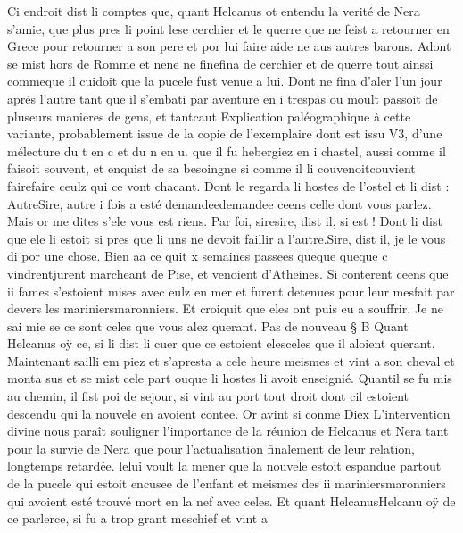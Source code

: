 \documentclass{article}
\begin{document}
\begin{pages}
\pstart  Ci endroit dist li comptes que, quant 
   Helcanus ot entendu la verité de Nera 
   s’amie, que plus pres li point
   lese cerchier et le querre que ne feist a retourner en 
   Grece pour retourner a 
   son pere et por lui faire aide ne 
   aus autres barons. Adont se mist hors de Romme 
   et nene ne finefina
   de cerchier et de querre tout ainssi commeque il cuidoit que 
   la pucele fust venue a lui. Dont ne fina d’aler l’un jour aprés l’autre tant que il s’embati 
   par aventure en i trespas ou moult passoit de pluseurs manieres de
   gens, et tantcaut
   Explication paléographique à cette variante, probablement issue de la copie de l'exemplaire
   dont est issu V3, d'une mélecture du t en c et du n
   en u. que il fu hebergiez en i 
   chastel, aussi comme il faisoit souvent, et enquist de sa besoingne si comme il 
   li couvenoitcouvient 
   fairefaire ceulz qui ce vont chacant. Dont le regarda
   li hostes de l’ostel et li dist :
   AutreSire, autre 
      i fois 
      a
      esté demandeedemandee ceens 
      celle dont vous parlez. Mais or me dites s’ele vous est riens.
   Par foi, siresire, dist il, si est !
   Dont li dist que ele li estoit si pres que li uns ne devoit faillir a l’autre.Sire, dist il, je le vous di por une chose. Bien 
      aa ce quit x semaines passees 
      queque queque c
      vindrentjurent marcheant de Pise,
      et venoient d’Atheines. Si conterent ceens que ii 
         fames s’estoient mises avec eulz en mer et furent detenues pour leur mesfait par devers 
         les mariniersmaronniers.
      Et croiquit que eles ont puis eu a souffrir. Je ne sai mie se ce sont 
      celes que vous alez querant. \pend
\pstart Pas de nouveau § B Quant Helcanus oÿ 
   ce, si li dist li cuer que ce estoient
      elesceles que il aloient querant. Maintenant sailli em piez et 
   s’apresta a cele heure meismes et vint a son cheval et monta sus et se mist 
   cele part ouque li hostes 
   li avoit enseignié. Quantil se fu mis au chemin, il fist poi de sejour, si vint au port 
   tout droit dont cil estoient descendu qui la nouvele 
   en avoient contee. Or avint si conme Diex 
   L'intervention divine nous paraît souligner l'importance de la réunion de Helcanus et Nera
   tant pour la survie de Nera que pour l'actualisation finalement de leur relation, longtemps retardée.
   lelui voult la mener que la nouvele estoit espandue 
   partout de la pucele qui estoit encusee de 
   l’enfant et meismes des ii 
   mariniersmaronniers
   qui avoient esté trouvé mort en la nef avec celes. Et quant 
   HelcanusHelcanu 
   oÿ de ce parlerce, si fu a trop grant meschief et vint a 

\end{pages}
\end{document}
